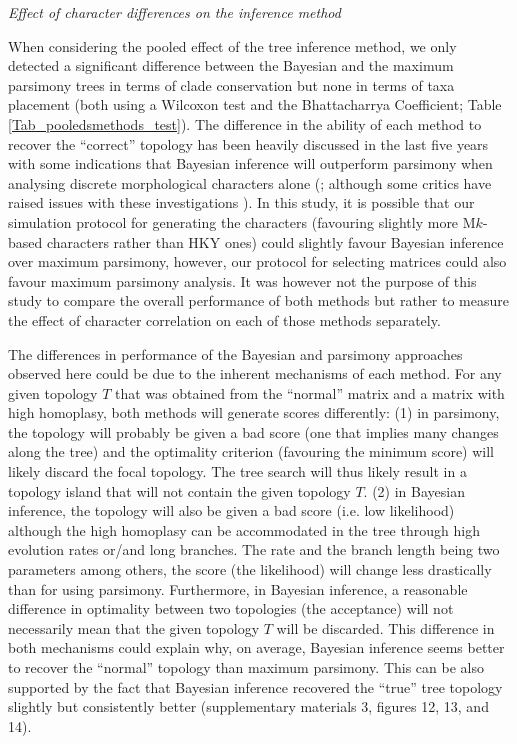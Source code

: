 \documentclass[12pt,letterpaper]{article}
\renewcommand{\subsection}[1]{%
\bigskip
\begin{center}
\begin{large}
\normalfont\itshape #1
\end{large}
\end{center}}
\begin{document}
\subsection{Effect of character differences on the inference method}
When considering the pooled effect of the tree inference method, we only detected a significant difference between the Bayesian and the maximum parsimony trees in terms of clade conservation but none in terms of taxa placement (both using a Wilcoxon test and the Bhattacharrya Coefficient; Table \ref{Tab_pooledsmethods_test}).
The difference in the ability of each method to recover the ``correct'' topology has been heavily discussed in the last five years with some indications that Bayesian inference will outperform parsimony when analysing discrete morphological characters alone (\citealt{wrightbayesian2014,OReilly20160081,puttick2017uncertain}; although some critics have raised issues with these investigations \citealt{spencerefficacy2013,goloboff2017weighted}).
In this study, it is possible that our simulation protocol for generating the characters (favouring slightly more M$k$-based characters rather than HKY ones) could slightly favour Bayesian inference over maximum parsimony, however, our protocol for selecting matrices \citep[i.e. those with in a $CI>0.26$ in a quick preliminary parsimony search;][]{OReilly20160081} could also favour maximum parsimony analysis.
It was however not the purpose of this study to compare the overall performance of both methods but rather to measure the effect of character correlation on each of those methods separately.

The differences in performance of the Bayesian and parsimony approaches observed here could be due to the inherent mechanisms of each method.
For any given topology $T$ that was obtained from the ``normal'' matrix and a matrix with high homoplasy, both methods will generate scores differently:
(1) in parsimony, the topology will probably be given a bad score (one that implies many changes along the tree) and the optimality criterion (favouring the minimum score) will likely discard the focal topology.
The tree search will thus likely result in a topology island that will not contain the given topology $T$.
(2) in Bayesian inference, the topology will also be given a bad score (i.e. low likelihood) although the high homoplasy can be accommodated in the tree through high evolution rates or/and long branches.
The rate and the branch length being two parameters among others, the score (the likelihood) will change less drastically than for using parsimony.
Furthermore, in Bayesian inference, a reasonable difference in optimality between two topologies (the acceptance) will not necessarily mean that the given topology $T$ will be discarded.
This difference in both mechanisms could explain why, on average, Bayesian inference seems better to recover the ``normal'' topology than maximum parsimony.
This can be also supported by the fact that Bayesian inference recovered the ``true'' tree topology slightly but consistently better (supplementary materials 3, figures 12, 13, and 14).
\end{document}
